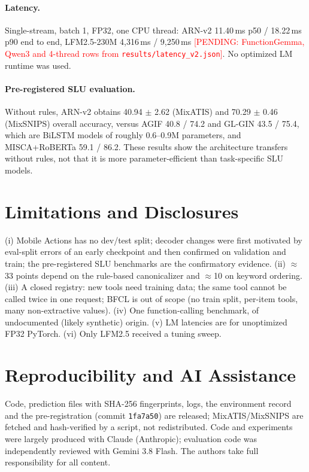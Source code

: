 \documentclass[11pt]{article}
\newcommand{\PENDING}[1]{\textcolor{red}{[PENDING: #1]}}
\newcommand{\arn}{ARN-v2}
\begin{document}
\paragraph{Latency.} Single-stream, batch 1, FP32, one CPU thread: \arn{} 11.40\,ms p50 / 18.22\,ms p90
end to end, LFM2.5-230M 4,316\,ms / 9,250\,ms \PENDING{FunctionGemma, Qwen3 and 4-thread rows from
\texttt{results/latency\_v2.json}}. No optimized LM runtime was used.

\paragraph{Pre-registered SLU evaluation.} Without rules, \arn{} obtains 40.94 $\pm$ 2.62 (MixATIS) and
70.29 $\pm$ 0.46 (MixSNIPS) overall accuracy, versus AGIF 40.8 / 74.2 and GL-GIN 43.5 / 75.4, which are
BiLSTM models of roughly 0.6--0.9M parameters, and MISCA+RoBERTa 59.1 / 86.2. These results show the
architecture transfers without rules, not that it is more parameter-efficient than task-specific SLU models.

\section{Limitations and Disclosures}\label{sec:limits}
(i) Mobile Actions has no dev/test split; decoder changes were first motivated by eval-split errors of an
early checkpoint and then confirmed on validation and train; the pre-registered SLU benchmarks are the
confirmatory evidence. (ii) $\approx$33 points depend on the rule-based canonicalizer and $\approx$10 on
keyword ordering. (iii) A closed registry: new tools need training data; the same tool cannot be called
twice in one request; BFCL is out of scope (no train split, per-item tools, many non-extractive values).
(iv) One function-calling benchmark, of undocumented (likely synthetic) origin. (v) LM latencies are for
unoptimized FP32 PyTorch. (vi) Only LFM2.5 received a tuning sweep.

\section{Reproducibility and AI Assistance}
Code, prediction files with SHA-256 fingerprints, logs, the environment record and the pre-registration
(commit \texttt{1fa7a50}) are released; MixATIS/MixSNIPS are fetched and hash-verified by a script, not
redistributed. Code and experiments were largely produced with Claude (Anthropic); evaluation code was
independently reviewed with Gemini 3.8 Flash. The authors take full responsibility for all content.



\end{document}
